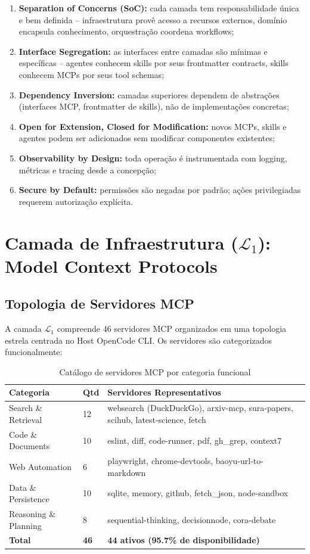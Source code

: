 \documentclass[12pt,a4paper,sumario=tradicional]{abntex2}
\begin{document}
\begin{enumerate}[leftmargin=*]
    \item \textbf{Separation of Concerns (SoC):} cada camada tem responsabilidade única e bem definida -- infraestrutura provê acesso a recursos externos, domínio encapsula conhecimento, orquestração coordena workflows;
    \item \textbf{Interface Segregation:} as interfaces entre camadas são mínimas e específicas -- agentes conhecem skills por seus frontmatter contracts, skills conhecem MCPs por seus tool schemas;
    \item \textbf{Dependency Inversion:} camadas superiores dependem de abstrações (interfaces MCP, frontmatter de skills), não de implementações concretas;
    \item \textbf{Open for Extension, Closed for Modification:} novos MCPs, skills e agentes podem ser adicionados sem modificar componentes existentes;
    \item \textbf{Observability by Design:} toda operação é instrumentada com logging, métricas e tracing desde a concepção;
    \item \textbf{Secure by Default:} permissões são negadas por padrão; ações privilegiadas requerem autorização explícita.
\end{enumerate}

\section{Camada de Infraestrutura ($\mathcal{L}_1$): Model Context Protocols}

\subsection{Topologia de Servidores MCP}

A camada $\mathcal{L}_1$ compreende 46 servidores MCP organizados em uma topologia estrela centrada no Host OpenCode CLI. Os servidores são categorizados funcionalmente:

\begin{table}[H]
\centering
\caption{Catálogo de servidores MCP por categoria funcional}
\label{tab:mcp-catalog}
\begin{tabular}{@{}llp{4.5cm}@{}}
\toprule
\textbf{Categoria} & \textbf{Qtd} & \textbf{Servidores Representativos} \\
\midrule
Search \& Retrieval & 12 & websearch (DuckDuckGo), arxiv-mcp, sura-papers, scihub, latest-science, fetch \\
Code \& Documents & 10 & eslint, diff, code-runner, pdf, gh\_grep, context7 \\
Web Automation & 6 & playwright, chrome-devtools, baoyu-url-to-markdown \\
Data \& Persistence & 10 & sqlite, memory, github, fetch\_json, node-sandbox \\
Reasoning \& Planning & 8 & sequential-thinking, decisionnode, cora-debate \\
\midrule
\textbf{Total} & \textbf{46} & \textbf{44 ativos (95.7\% de disponibilidade)} \\
\bottomrule
\end{tabular}
\end{table}
\end{document}
